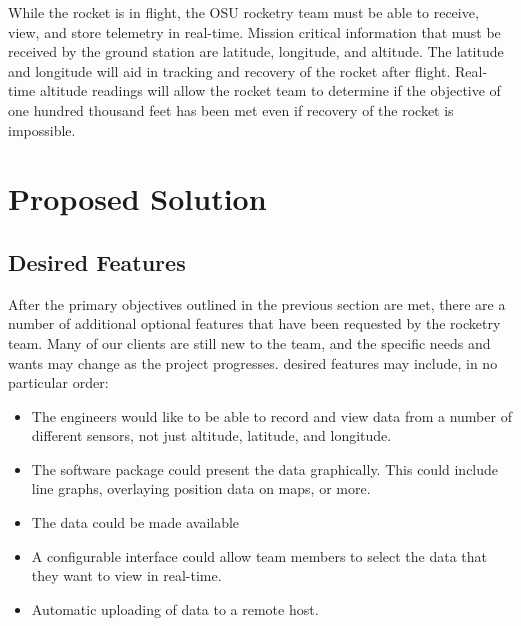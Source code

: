 \documentclass[10pt,journal,draftclsnofoot,onecolumn]{IEEEtran}
\begin{document}
	While the rocket is in flight, the \ac{OSU} rocketry team
	must be able to receive, view, and store telemetry in real-time.
	Mission critical information that must be received by the ground
	station are latitude, longitude, and altitude. The latitude
	and longitude will aid in tracking and recovery of the rocket
	after flight. Real-time altitude readings will allow the rocket
	team to determine if the objective of one hundred thousand feet
	has been met even if recovery of the rocket is impossible.
	
	
	\section{Proposed Solution}
	
	\subsection{Desired Features}
	After the primary objectives outlined in the previous section
	are met, there are a number of additional optional features
	that have been requested by the rocketry team.
	Many of our clients are still new to the team, and the specific
	needs and wants may change as the project progresses.
	desired features may include, in no particular order:
	
	\begin{itemize}
		\item The engineers would like to be able to record and view data
		from a number of different sensors, not just altitude,
		latitude, and longitude.
		
		\item The software package could present the data graphically.
		This could include line graphs, overlaying position data
		on maps, or more.
		
		\item The data could be made available 
		
		\item A configurable interface could allow team members
		to select the data that they want to view in real-time.
		
		\item Automatic uploading of data to a remote host.
		
	\end{itemize}
	
\end{document}
